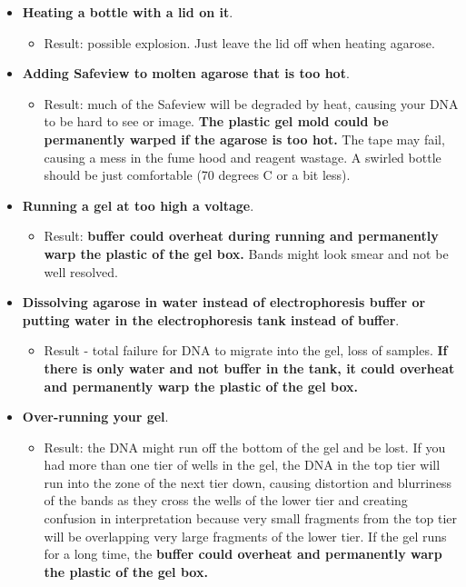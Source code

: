 \documentclass[
  letterpaper,
  DIV=11,
  numbers=noendperiod]{scrreprt}
\providecommand{\tightlist}{%
  \setlength{\itemsep}{0pt}\setlength{\parskip}{0pt}}\usepackage{longtable,booktabs,array}
\begin{document}
\begin{itemize}
\item
  \textbf{Heating a bottle with a lid on it}.

  \begin{itemize}
  \tightlist
  \item
    Result: possible explosion. Just leave the lid off when heating
    agarose.
  \end{itemize}
\item
  \textbf{Adding Safeview to molten agarose that is too hot}.

  \begin{itemize}
  \tightlist
  \item
    Result: much of the Safeview will be degraded by heat, causing your
    DNA to be hard to see or image. \textbf{The plastic gel mold could
    be permanently warped if the agarose is too hot.} The tape may fail,
    causing a mess in the fume hood and reagent wastage. A swirled
    bottle should be just comfortable (70 degrees C or a bit less).
  \end{itemize}
\item
  \textbf{Running a gel at too high a voltage}.

  \begin{itemize}
  \tightlist
  \item
    Result: \textbf{buffer could overheat during running and permanently
    warp the plastic of the gel box.} Bands might look smear and not be
    well resolved.
  \end{itemize}
\item
  \textbf{Dissolving agarose in water instead of electrophoresis buffer
  or putting water in the electrophoresis tank instead of buffer}.

  \begin{itemize}
  \tightlist
  \item
    Result - total failure for DNA to migrate into the gel, loss of
    samples. \textbf{If there is only water and not buffer in the tank,
    it could overheat and permanently warp the plastic of the gel box.}
  \end{itemize}
\item
  \textbf{Over-running your gel}.

  \begin{itemize}
  \tightlist
  \item
    Result: the DNA might run off the bottom of the gel and be lost. If
    you had more than one tier of wells in the gel, the DNA in the top
    tier will run into the zone of the next tier down, causing
    distortion and blurriness of the bands as they cross the wells of
    the lower tier and creating confusion in interpretation because very
    small fragments from the top tier will be overlapping very large
    fragments of the lower tier. If the gel runs for a long time, the
    \textbf{buffer could overheat and permanently warp the plastic of
    the gel box.}
  \end{itemize}
\end{itemize}
\end{document}
